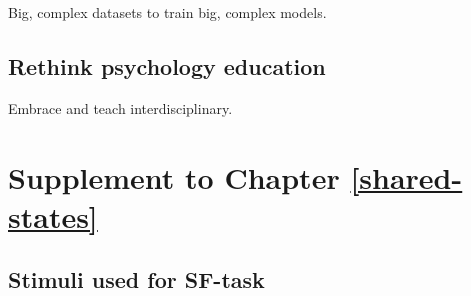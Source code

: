 \documentclass[12pt,american,a4paper,oneside,]{memoir} %
\begin{document}
Big, complex datasets to train big, complex models.

\hypertarget{rethink-psychology-education}{%
\section{Rethink psychology education}\label{rethink-psychology-education}}

Embrace and teach interdisciplinary.

\hypertarget{appendix-appendix}{%
\appendix}


\cleardoublepage
{}
{}
\appendixpage*
\setlength\beforechapskip{-\baselineskip}

\hypertarget{shared-states-supplement}{%
\chapter{Supplement to Chapter \ref{shared-states}}\label{shared-states-supplement}}

\hypertarget{stimuli-used-for-sf-task}{%
\section{Stimuli used for SF-task}\label{stimuli-used-for-sf-task}}

\begingroup\fontsize{9}{11}\selectfont
\end{document}
